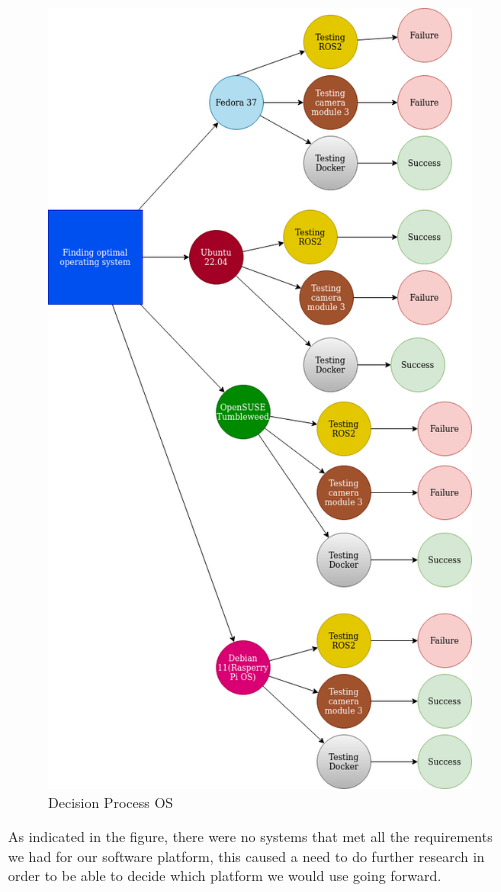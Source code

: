 \begin{figure}[h]
    \centering
    \includegraphics[scale=0.5]{fig/decision_os.png}
    \caption{Decision Process OS}
    \label{fig:osarch}
\end{figure}


As indicated in the figure, there were no systems that met all the requirements we had for our software platform, this caused a need to do further research in order to be able to decide which platform we would use going forward. \\

